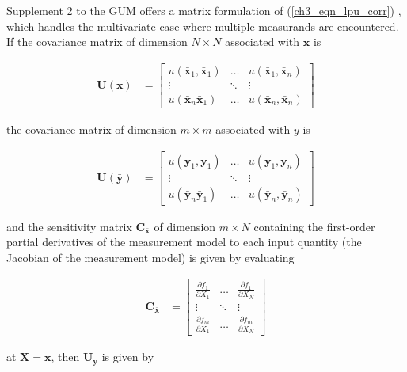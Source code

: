 \documentclass[../thesis/thesis.tex]{subfiles}
\begin{document}
\begin{refsection}
Supplement 2 to the GUM offers a matrix formulation of (\ref{ch3_eqn_lpu_corr}) \cite[6.2.1.3]{GUM_S2}, which handles the multivariate case where multiple measurands are encountered. If the covariance matrix of dimension $N \times N$ associated with $\bar{\bm{x}}$ is

\begin{align}
\boldsymbol U(\bar{\boldsymbol x}) & = 
\begin{bmatrix}
u{(\bar{\boldsymbol x}_1,\bar{\boldsymbol x}_1)}&\dots&u(\bar{\boldsymbol x}_1,\bar{\boldsymbol x}_n)\\
\vdots&\ddots&\vdots\\
u(\bar{\boldsymbol x}_n\bar{\boldsymbol x}_1)&\dots&u{(\bar{\boldsymbol x}_n,\bar{\boldsymbol x}_n)}
\end{bmatrix}
\end{align}

the covariance matrix of dimension $m \times m$ associated with $\bar y$ is

\begin{align}
\boldsymbol U(\bar{\boldsymbol y}) & = 
\begin{bmatrix}
u{(\bar{\boldsymbol y}_1,\bar{\boldsymbol y}_1)}&\dots&u(\bar{\boldsymbol y}_1,\bar{\boldsymbol y}_n)\\
\vdots&\ddots&\vdots\\
u(\bar{\boldsymbol y}_n\bar{\boldsymbol y}_1)&\dots&u{(\bar{\boldsymbol y}_n,\bar{\boldsymbol y}_n)}
\end{bmatrix}
\end{align}

and the sensitivity matrix $\boldsymbol C_{\bar{\boldsymbol x}}$ of dimension $m \times N$ containing the first-order partial derivatives of the measurement model to each input quantity (the Jacobian of the measurement model) is given by evaluating

\begin{align}
\boldsymbol C_{\bar{\boldsymbol x}} & = 
\begin{bmatrix}
\displaystyle \frac{\partial f_1}{\partial X_1}&\dots&\displaystyle \frac{\partial f_1}{\partial X_N}\\
\vdots&\ddots&\vdots\\
\displaystyle \frac{\partial f_m}{\partial X_1}&\dots&\displaystyle \frac{\partial f_m}{\partial X_N}
\end{bmatrix}
\label{ch3_eqn_sens_matrix}
\end{align}

at $\boldsymbol X = \bar{\boldsymbol x}$, then $\boldsymbol U_{\bar{\boldsymbol y}}$ is given by


\end{refsection}
\end{document}
